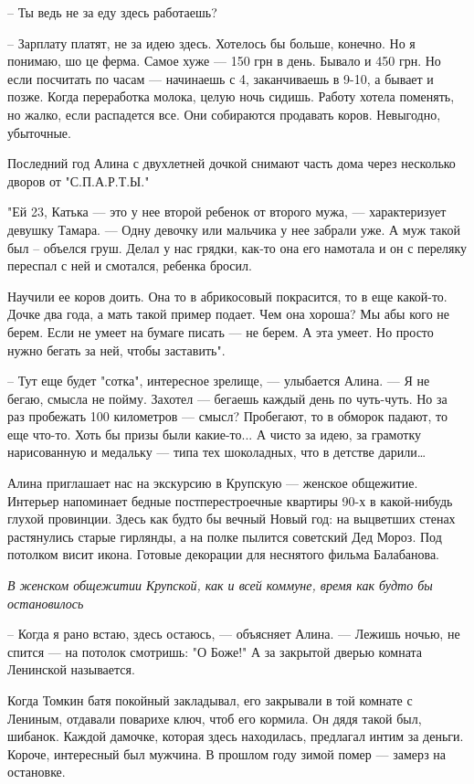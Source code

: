 \documentclass[a4paper,11pt]{extreport}
\begin{document}
– Ты ведь не за еду здесь работаешь?

– Зарплату платят, не за идею здесь. Хотелось бы больше, конечно. Но я понимаю,
шо це ферма. Самое хуже --- 150 грн в день. Бывало и 450 грн. Но если посчитать
по часам --- начинаешь с 4, заканчиваешь в 9-10, а бывает и позже. Когда
переработка молока, целую ночь сидишь. Работу хотела поменять, но жалко, если
распадется все. Они собираются продавать коров. Невыгодно, убыточные.

Последний год Алина с двухлетней дочкой снимают часть дома через несколько
дворов от "С.П.А.Р.Т.Ы." 

"Ей 23, Катька --- это у нее второй ребенок от второго мужа, --- характеризует
девушку Тамара. --- Одну девочку или мальчика у нее забрали уже. А муж такой был
– объелся груш. Делал у нас грядки, как-то она его намотала и он с переляку
переспал с ней и смотался, ребенка бросил. 

Научили ее коров доить. Она то в абрикосовый покрасится, то в еще какой-то.
Дочке два года, а мать такой пример подает. Чем она хороша? Мы абы кого не
берем. Если не умеет на бумаге писать --- не берем. А эта умеет. Но просто нужно
бегать за ней, чтобы заставить".

– Тут еще будет "сотка", интересное зрелище, --- улыбается Алина. --- Я не бегаю,
смысла не пойму. Захотел --- бегаешь каждый день по чуть-чуть. Но за раз
пробежать 100 километров --- смысл? Пробегают, то в обморок падают, то еще
что-то. Хоть бы призы были какие-то... А чисто за идею, за грамотку
нарисованную и медальку --- типа тех шоколадных, что в детстве дарили…

Алина приглашает нас на экскурсию в Крупскую --- женское общежитие. Интерьер
напоминает бедные постперестроечные квартиры 90-х в какой-нибудь глухой
провинции. Здесь как будто бы вечный Новый год: на выцветших стенах растянулись
старые гирлянды, а на полке пылится советский Дед Мороз. Под потолком висит
икона. Готовые декорации для неснятого фильма Балабанова.

\emph{В женском общежитии Крупской, как и всей коммуне, время как будто бы остановилось}

– Когда я рано встаю, здесь остаюсь, --- объясняет Алина. --- Лежишь ночью, не
спится --- на потолок смотришь: "О Боже!" А за закрытой дверью комната Ленинской
называется. 

Когда Томкин батя покойный закладывал, его закрывали в той комнате с Лениным,
отдавали поварихе ключ, чтоб его кормила. Он дядя такой был, шибанок. Каждой
дамочке, которая здесь находилась, предлагал интим за деньги. Короче,
интересный был мужчина. В прошлом году зимой помер --- замерз на остановке. 
\end{document}
